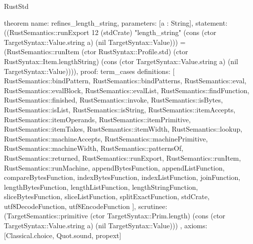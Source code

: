 \begin{lexlean}{RustStd}
\begin{semanticmodule}
theorem{
  name: refines_length_string,
  parameters: [a : String],
  statement: ((RustSemantics::runExport 12 (stdCrate) "length_string" (cons (ctor TargetSyntax::Value.string a) (nil TargetSyntax::Value))) = (RustSemantics::runItem (ctor RustSyntax::Profile.std) (ctor RustSyntax::Item.lengthString) (cons (ctor TargetSyntax::Value.string a) (nil TargetSyntax::Value)))),
  proof: term_cases{
    definitions: [
      RustSemantics::bindPattern,
      RustSemantics::bindPatterns,
      RustSemantics::eval,
      RustSemantics::evalBlock,
      RustSemantics::evalList,
      RustSemantics::findFunction,
      RustSemantics::finished,
      RustSemantics::invoke,
      RustSemantics::isBytes,
      RustSemantics::isList,
      RustSemantics::isString,
      RustSemantics::itemAccepts,
      RustSemantics::itemOperands,
      RustSemantics::itemPrimitive,
      RustSemantics::itemTakes,
      RustSemantics::itemWidth,
      RustSemantics::lookup,
      RustSemantics::machineAccepts,
      RustSemantics::machinePrimitive,
      RustSemantics::machineWidth,
      RustSemantics::patternsOf,
      RustSemantics::returned,
      RustSemantics::runExport,
      RustSemantics::runItem,
      RustSemantics::runMachine,
      appendBytesFunction,
      appendListFunction,
      compareBytesFunction,
      indexBytesFunction,
      indexListFunction,
      joinFunction,
      lengthBytesFunction,
      lengthListFunction,
      lengthStringFunction,
      sliceBytesFunction,
      sliceListFunction,
      splitExactFunction,
      stdCrate,
      utf8DecodeFunction,
      utf8EncodeFunction
    ],
    scrutinee: (TargetSemantics::primitive (ctor TargetSyntax::Prim.length) (cons (ctor TargetSyntax::Value.string a) (nil TargetSyntax::Value)))
  },
  axioms: [Classical.choice, Quot.sound, propext]
}


\end{semanticmodule}
\end{lexlean}
